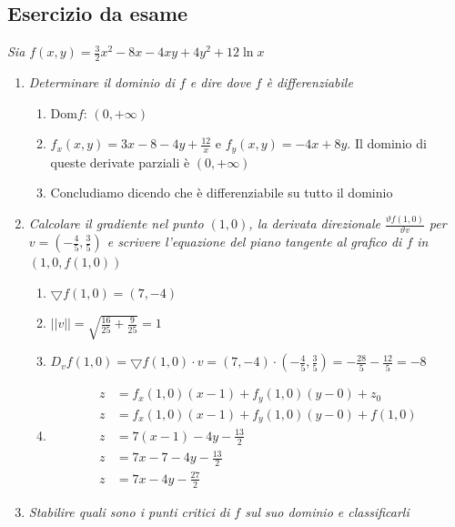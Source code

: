 \documentclass[10pt, a4paper]{article}
\begin{document}
    \subsection{Esercizio da esame}
    \textit{Sia $f(x,y)=\frac{3}{2}x^2-8x-4xy+4y^2+12\ln x$}
    \begin{enumerate}
        \item \textit{Determinare il dominio di $f$ e dire dove $f$ è differenziabile} \begin{enumerate}
            \item Dom$f$: $(0,+\infty)$
            \item $f_x(x,y)=3x-8-4y+\frac{12}{x}$ e $f_y(x,y)=-4x+8y$. Il dominio di queste derivate parziali è $(0,+\infty)$
            \item Concludiamo dicendo che è differenziabile su tutto il dominio
        \end{enumerate}
        \item \textit{Calcolare il gradiente  nel punto $(1,0)$, la derivata direzionale $\frac{\vartheta f(1,0)}{\vartheta v}$ per $v=\left(-\frac{4}{5},\frac{3}{5}\right)$ e scrivere l'equazione del piano tangente al grafico di $f$ in $(1,0,f(1,0))$} \begin{enumerate}
            \item $\bigtriangledown f(1,0)=(7,-4)$
            \item $||v||=\sqrt{\frac{16}{25}+\frac{9}{25}}=1$
            \item $D_vf(1,0)=\bigtriangledown f(1,0)\cdot v=(7,-4)\cdot(-\frac{4}{5},\frac{3}{5})=-\frac{28}{5}-\frac{12}{5}=-8$
            \item \begin{equation*}
                \begin{split}
                    z&=f_x(1,0)(x-1)+f_y(1,0)(y-0)+z_0\\
                    z&=f_x(1,0)(x-1)+f_y(1,0)(y-0)+f(1,0)\\
                    z&=7(x-1)-4y-\frac{13}{2}\\
                    z&=7x-7-4y-\frac{13}{2}\\
                    z&=7x-4y-\frac{27}{2}
                \end{split}
            \end{equation*}
        \end{enumerate}
        \item \textit{Stabilire quali sono i punti critici di $f$ sul suo dominio e classificarli} \begin{enumerate}

\end{enumerate}
\end{enumerate}
\end{document}

